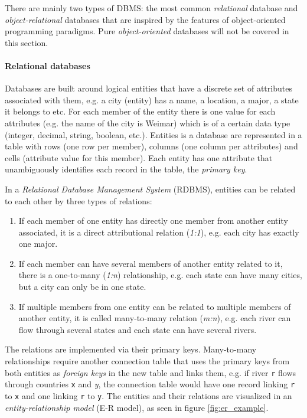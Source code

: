 There are mainly two types of DBMS: the most common \emph{relational} database and \emph{object-relational} databases that are inspired by the features of object-oriented programming paradigms. Pure \emph{object-oriented} databases will not be covered in this section.

\paragraph{Relational databases} %
\label{par:relational_databases}
Databases are built around logical entities that have a discrete set of attributes associated with them, e.g. a city (entity) has a name, a location, a major, a state it belongs to etc. For each member of the entity there is one value for each attributes (e.g. the name of the city is Weimar) which is of a certain data type (integer, decimal, string, boolean, etc.). Entities is a database are represented in a table with rows (one row per member), columns (one column per attributes) and cells (attribute value for this member). Each entity has one attribute that unambiguously identifies each record in the table, the \emph{primary key}.

In a \emph{Relational Database Management System} (RDBMS), entities can be related to each other by three types of relations:
\begin{enumerate}
  \item If each member of one entity has directly one member from another entity associated, it is a direct attributional relation (\emph{1:1}), e.g. each city has exactly one major.
  \item If each member can have several members of another entity related to it, there is a one-to-many (\emph{1:n}) relationship, e.g. each state can have many cities, but a city can only be in one state.
  \item If multiple members from one entity can be related to multiple members of another entity, it is called many-to-many relation (\emph{m:n}), e.g. each river can flow through several states and each state can have several rivers.
\end{enumerate}
The relations are implemented via their primary keys. Many-to-many relationships require another connection table that uses the primary keys from both entities as \emph{foreign keys} in the new table and links them, e.g. if river \texttt{r} flows through countries \texttt{x} and \emph{y}, the connection table would have one record linking \texttt{r} to \texttt{x} and one linking \texttt{r} to \texttt{y}. The entities and their relations are visualized in an \emph{entity-relationship model} (E-R model), as seen in figure \ref{fig:er_example}.

